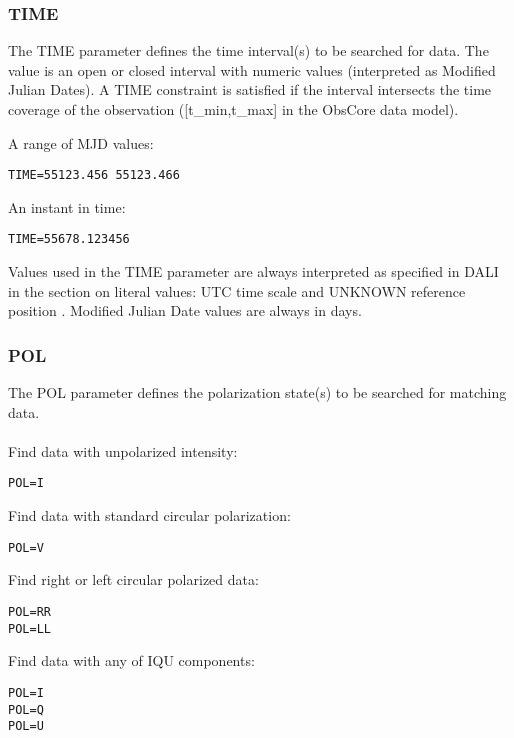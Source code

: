 \documentclass[11pt,a4paper]{ivoa}
\begin{document}
\subsubsection{TIME}
\label{sec:TIME}

The TIME parameter defines the time interval(s) to be searched for data. The value is an open or closed interval with numeric values (interpreted as Modified Julian Dates). A TIME constraint is satisfied if the interval intersects the time coverage of the observation ([t\_min,t\_max] in the ObsCore data model).

A range of MJD values:

\begin{lstlisting}
TIME=55123.456 55123.466
\end{lstlisting}

An instant in time:

\begin{lstlisting}
TIME=55678.123456
\end{lstlisting}

Values used in the TIME parameter are always interpreted as specified in DALI in the section on literal values: UTC time scale and UNKNOWN reference position \citep{2007ivoa.spec.1030R}. Modified Julian Date values are always in days.

\subsubsection{POL}
\label{sec:POL}

The POL parameter defines the polarization state(s) to be searched  for matching data.  \\ \\
Find data with unpolarized intensity:

\begin{lstlisting}
POL=I
\end{lstlisting}
Find data with standard circular polarization:

\begin{lstlisting}
POL=V
\end{lstlisting}
Find  right or left circular polarized data:

\begin{lstlisting}
POL=RR
POL=LL
\end{lstlisting}
Find data with any of IQU components:

\begin{lstlisting}
POL=I
POL=Q
POL=U
\end{lstlisting}
\end{document}
